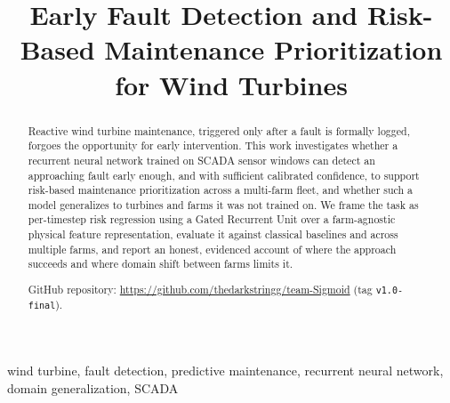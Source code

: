 \documentclass[conference]{IEEEtran}
\begin{document}
\title{Early Fault Detection and Risk-Based Maintenance Prioritization for Wind Turbines}

\author{
\and
{}
\and
{}
\and
{}
}

\maketitle

\begin{abstract}
Reactive wind turbine maintenance, triggered only after a fault is
formally logged, forgoes the opportunity for early intervention. This
work investigates whether a recurrent neural network trained on SCADA
sensor windows can detect an approaching fault early enough, and with
sufficient calibrated confidence, to support risk-based maintenance
prioritization across a multi-farm fleet, and whether such a model
generalizes to turbines and farms it was not trained on. We frame the
task as per-timestep risk regression using a Gated Recurrent Unit over a
farm-agnostic physical feature representation, evaluate it against
classical baselines and across multiple farms, and report an honest,
evidenced account of where the approach succeeds and where domain shift
between farms limits it.

GitHub repository: \url{https://github.com/thedarkstringg/team-Sigmoid}
(tag \texttt{v1.0-final}).
\end{abstract}

\begin{IEEEkeywords}
wind turbine, fault detection, predictive maintenance, recurrent neural
network, domain generalization, SCADA
\end{IEEEkeywords}
\end{document}
